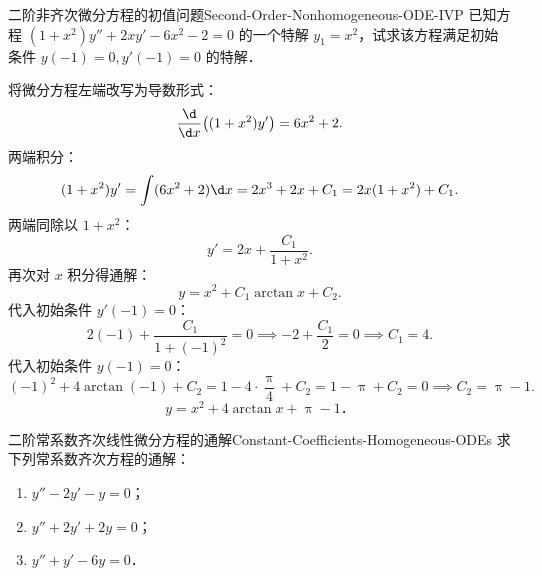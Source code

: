 \begin{problem}{二阶非齐次微分方程的初值问题}{Second-Order-Nonhomogeneous-ODE-IVP}
    已知方程 $(1+x^2)y'' + 2xy' - 6x^2 - 2 = 0$ 的一个特解 $y_1 = x^2$，试求该方程满足初始条件 $y(-1) = 0, y'(-1) = 0$ 的特解．
\end{problem}

\begin{solution}
    将微分方程左端改写为导数形式：
    \begin{equation}
        \frac{\d}{\d x}\bigl((1 + x^2)y'\bigr) = 6x^2 + 2.
    \end{equation}
    两端积分：
    \begin{equation}
        (1 + x^2)y' = \int (6x^2 + 2)\d x = 2x^3 + 2x + C_1 = 2x(1 + x^2) + C_1.
    \end{equation}
    两端同除以 $1 + x^2$：
    \begin{equation}
        y' = 2x + \frac{C_1}{1 + x^2}.
    \end{equation}
    再次对 $x$ 积分得通解：
    \begin{equation}
        y = x^2 + C_1 \arctan x + C_2.
    \end{equation}
    代入初始条件 $y'(-1) = 0$：
    \begin{equation}
        2(-1) + \frac{C_1}{1 + (-1)^2} = 0 \implies -2 + \frac{C_1}{2} = 0 \implies C_1 = 4.
    \end{equation}
    代入初始条件 $y(-1) = 0$：
    \begin{equation}
        (-1)^2 + 4\arctan(-1) + C_2 = 1 - 4 \cdot \frac{\uppi}{4} + C_2 = 1 - \uppi + C_2 = 0 \implies C_2 = \uppi - 1.
    \end{equation}
    \begin{equation}
        \boxed{y = x^2 + 4\arctan x + \uppi - 1．}
    \end{equation}
\end{solution}

\begin{problem}{二阶常系数齐次线性微分方程的通解}{Constant-Coefficients-Homogeneous-ODEs}
    求下列常系数齐次方程的通解：
    \begin{enumerate}
        \item $y'' - 2y' - y = 0$；
        \item $y'' + 2y' + 2y = 0$；
        \item $y'' + y' - 6y = 0$．
    \end{enumerate}
\end{problem}

